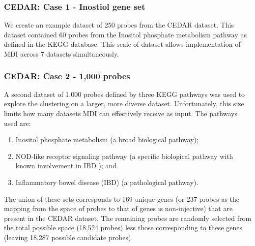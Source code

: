 \documentclass[12pt]{article} %
\begin{document}
	 

	\subsubsection{CEDAR: Case 1 - Inostiol gene set} \label{sec:case_studies:cedar:dataset_1}

	We create an example dataset of 250 probes from the CEDAR dataset. This dataset contained 60 probes from the Inositol phosphate metabolism pathway as defined in the KEGG database. This scale of dataset allows implementation of MDI across 7 datasets simultaneously.
	
	\subsubsection{CEDAR: Case 2 - 1,000 probes} \label{sec:case_studies:cedar:dataset_2}
	
	A second dataset of 1,000 probes defined by three KEGG pathways was used to explore the clustering on a larger, more diverse dataset. Unfortunately, this size limits how many datasets MDI can effectively receive as input. The pathways used are:
	
	\begin{enumerate} \label{list:kegg_pathways}
		\item Inositol phosphate metabolism (a broad biological pathway);
		\item NOD-like receptor signaling pathway (a specific biological pathway with known involvement in IBD \cite{CarneiroNodlikeproteinsinflammation2008}\cite{GarrettHomeostasisInflammationIntestine2010}); and
		\item Inflammatory bowel disease (IBD) (a pathological pathway).
	\end{enumerate}

	The union of these sets corresponds to 169 unique genes (or 237 probes as the mapping from the space of probes to that of genes is non-injective) that are present in the CEDAR dataset. The remaining probes are randomly selected from the total possible space (18,524 probes) less those corresponding to these genes (leaving 18,287 possible candidate probes).
\end{document}
